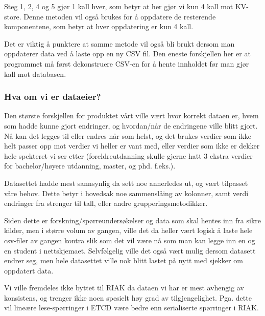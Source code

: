 Steg 1, 2, 4 og 5 gjør 1 kall hver, som betyr at her gjør vi kun 4 kall mot KV-store. Denne metoden vil også brukes for å oppdatere de resterende komponentene, som betyr at hver oppdatering er kun 4 kall.

Det er viktig å punktere at samme metode vil også bli brukt dersom man oppdaterer data ved å laste 
opp en ny CSV fil. Den eneste forskjellen her er at programmet må først dekonstruere CSV-en for å hente innholdet før man gjør kall mot databasen.

\subsubsection{Hva om vi er dataeier?}
Den største forskjellen for produktet vårt ville vært hvor korrekt dataen er, hvem som hadde kunne gjort endringer, og hvordan/når de endringene ville blitt gjort. Nå kan det legges til eller endres når som helst, og det brukes verdier som ikke helt passer opp mot verdier vi heller er vant med, eller verdier som ikke er dekker hele spekteret vi ser etter (foreldreutdanning skulle gjerne hatt 3 ekstra verdier for bachelor/høyere utdanning, master, og phd. f.eks.).

Datasettet hadde mest sannsynlig da sett noe annerledes ut, og vært tilpasset våre behov. Dette betyr i hovedsak noe sammenslåing av kolonner, samt verdi endringer fra strenger til tall, eller andre grupperingsmetodikker.

Siden dette er forskning/spørreundersøkelser og data som skal hentes inn fra sikre kilder, men i større volum av gangen, ville det da heller vært logisk å laste hele csv-filer av gangen kontra slik som det vil være nå som man kan legge inn en og en student i nettskjemaet. Selvfølgelig ville det også vært mulig dersom datasett endrer seg, men hele datasettet ville nok blitt lastet på nytt med sjekker om oppdatert data.

Vi ville fremdeles ikke byttet til RIAK da dataen vi har er mest avhengig av konsistens, og trenger ikke noen spesielt høy grad av tilgjengelighet. Pga. dette vil lineære lese-spørringer i ETCD være bedre enn serialiserte spørringer i RIAK.